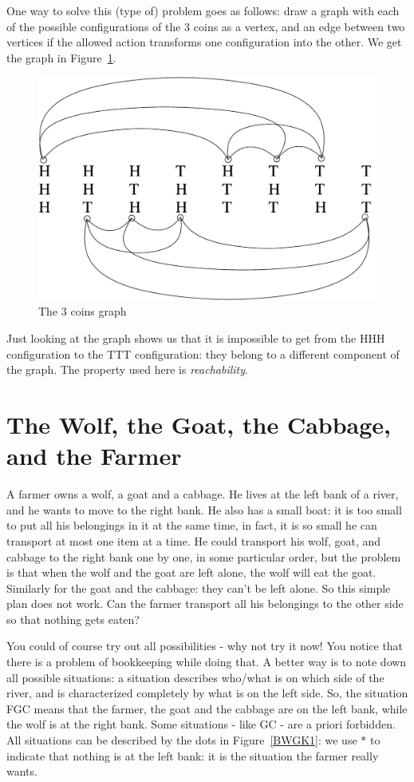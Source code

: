 One way to solve this (type of) problem goes as follows: draw a graph
with each of the possible configurations of the 3 coins as a vertex,
and an edge between two vertices if the allowed action transforms one
configuration into the other. We get the graph in Figure~\ref{munten}.

\begin{figure}[ht]
	\centering
	\includegraphics[width=0.5\linewidth,keepaspectratio]{munteneng}
	\caption{The 3 coins graph \label{munten}}
\end{figure}

Just looking at the graph shows us that it is impossible to get from
the HHH configuration to the TTT configuration: they belong to a
different component of the graph. The property used here is {\em
reachability}.


\section{The Wolf, the Goat, the Cabbage, and the Farmer}

A farmer owns a wolf, a goat and a cabbage. He lives at the left bank
of a river, and he wants to move to the right bank. He also has a
small boat: it is too small to put all his belongings in it at the
same time, in fact, it is so small he can transport at most one
item at a time. He could transport his wolf, goat, and
cabbage to the right bank one by one, in some particular order, but the problem
is that when the wolf and the goat are left alone, the wolf will eat
the goat. Similarly for the goat and the cabbage: they can't be left
alone. So this simple plan does not work. Can the farmer transport all
his belongings to the other side so that nothing gets eaten?

You could of course try out all possibilities - why not try it now!
You notice that there is a problem of bookkeeping while doing that.
A better way is to note down all possible situations: a situation
describes who/what is on which side of the river, and is characterized
completely by what is on the left side. So, the situation FGC means
that the farmer, the goat and the cabbage are on the left bank, while
the wolf is at the right bank. Some situations - like GC - are a
priori forbidden. All situations can be described by the dots in
Figure~\ref{BWGK1}: we use $\ast$ to indicate that nothing is at the
left bank: it is the situation the farmer really wants.

